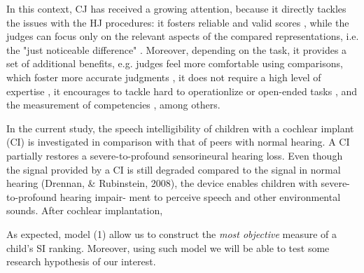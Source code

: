 In this context, CJ has received a growing attention, because it directly tackles the issues with the HJ procedures: it fosters reliable \citep{Verhavert_et_al_2019} and valid scores \citep{Bramley_2008, Lesterhuis_2018}, while the judges can focus only on the relevant aspects of the compared representations, i.e. the "just noticeable difference" \citep{Lesterhuis_2018}. Moreover, depending on the task, it provides a set of additional benefits, e.g. judges feel more comfortable using comparisons, which foster more accurate judgments \citep{Gill_et_al_2013}, it does not require a high level of expertise \citep{Lesterhuis_2018, Boonen_et_al_2020}, it encourages to tackle hard to operationlize or open-ended tasks \citep{Pollitt_2012a, Pollitt_2012b, Lesterhuis_2018}, and the measurement of competencies \citep{Verhavert_2018}, among others.
%
%


In the current study, the speech intelligibility of children with a cochlear implant
(CI) is investigated in comparison with that of peers with normal hearing. A CI partially
restores a severe-to-profound sensorineural hearing loss. Even though the signal provided
by a CI is still degraded compared to the signal in normal hearing (Drennan, &
Rubinstein, 2008), the device enables children with severe-to-profound hearing impair-
ment to perceive speech and other environmental sounds. After cochlear implantation,


As expected, model (1) allow us to construct the \textit{most objective} measure of a child's SI ranking. Moreover, using such model we will be able to test some research hypothesis of our interest.